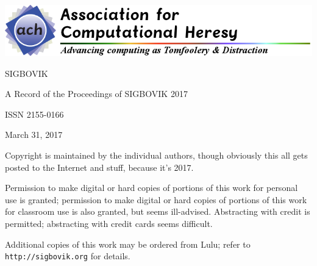 \documentclass[12pt]{article}
\begin{document}
\newcommand\thisyear{2017}

\includegraphics[width=\textwidth]{copyright-header.png}\\
\vspace{10em}

SIGBOVIK

A Record of the Proceedings of SIGBOVIK \thisyear

ISSN 2155-0166

March 31, \thisyear

\vspace{2em}

Copyright is maintained by the individual authors, though obviously this all gets posted to the Internet and stuff, because it's \thisyear.

Permission to make digital or hard copies of portions of this work for personal use is granted; permission to make digital or hard copies of portions of this work for classroom use is also granted, but seems ill-advised.
Abstracting with credit is permitted; abstracting with credit cards seems difficult.

Additional copies of this work may be ordered from Lulu; refer to {\tt http://sigbovik.org} for details.

\thispagestyle{empty}
\end{document}
